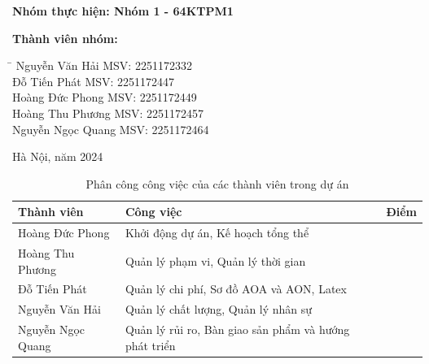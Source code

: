\begin{titlepage}
    \begin{flushleft}
        \textbf{Nhóm thực hiện: Nhóm 1 - 64KTPM1}
    \end{flushleft}
    
    \begin{flushleft}
        \textbf{Thành viên nhóm:}
    \end{flushleft}
    
    \begin{flushleft}
        \begin{tabbing}
            \hspace{4cm}\= \hspace{8cm} \kill
            Nguyễn Văn Hải\> MSV: 2251172332\\
            Đỗ Tiến Phát\> MSV: 2251172447\\
            Hoàng Đức Phong\> MSV: 2251172449\\
            Hoàng Thu Phương\> MSV: 2251172457\\
            Nguyễn Ngọc Quang\> MSV: 2251172464\\
        \end{tabbing}
    \end{flushleft}
    
    \begin{center}
        \vfill
        Hà Nội, năm 2024
    \end{center}
\end{titlepage}

\begin{table}[h]
    \begin{tabular}{|l|p{9cm}|c|}
    \hline
    \textbf{Thành viên} & \textbf{Công việc} & \textbf{Điểm} \\ \hline
    Hoàng Đức Phong & Khởi động dự án, Kế hoạch tổng thể & \\ \hline
    Hoàng Thu Phương & Quản lý phạm vi, Quản lý thời gian & \\ \hline
    Đỗ Tiến Phát & Quản lý chi phí, Sơ đồ AOA và AON, Latex & \\ \hline
    Nguyễn Văn Hải & Quản lý chất lượng, Quản lý nhân sự & \\ \hline
    Nguyễn Ngọc Quang & Quản lý rủi ro, Bàn giao sản phẩm và hướng phát triển & \\ \hline
    \end{tabular}
    \caption{Phân công công việc của các thành viên trong dự án}
    \label{tab:phancong}
\end{table}